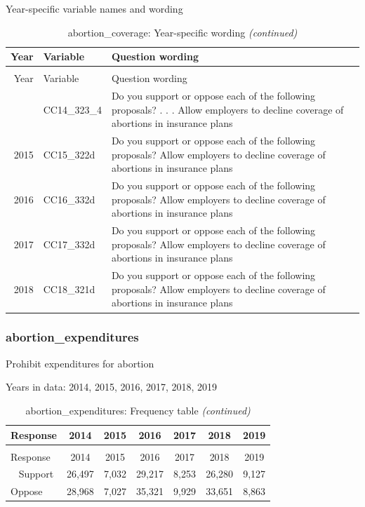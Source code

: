 \documentclass[12pt]{article}
\begin{document}
\endgroup{}

Year-specific variable names and wording

\begin{longtable}[t]{rl>{\raggedright\arraybackslash}p{10cm}}
\caption{\label{tab:unnamed-chunk-4}abortion\_coverage: Year-specific wording}\\
\toprule
Year & Variable & Question wording\\
\midrule
\endfirsthead
\caption[]{abortion\_coverage: Year-specific wording \textit{(continued)}}\\
\toprule
Year & Variable & Question wording\\
\midrule
\endhead
\
\endfoot
\bottomrule
\endlastfoot
2014 & CC14\_323\_4 & Do you support or oppose each of the following proposals? . . . Allow employers to decline coverage of abortions in insurance plans\\
2015 & CC15\_322d & Do you support or oppose each of the following proposals? Allow employers to decline coverage of abortions in insurance plans\\
2016 & CC16\_332d & Do you support or oppose each of the following proposals? Allow employers to decline coverage of abortions in insurance plans\\
2017 & CC17\_332d & Do you support or oppose each of the following proposals? Allow employers to decline coverage of abortions in insurance plans\\
2018 & CC18\_321d & Do you support or oppose each of the following proposals? Allow employers to decline coverage of abortions in insurance plans\\*
\end{longtable}

\subsubsection{abortion\_expenditures}\label{abortion_expenditures}

Prohibit expenditures for abortion

Years in data: 2014, 2015, 2016, 2017, 2018,
2019\begingroup\fontsize{10}{12}\selectfont

\begin{longtable}[t]{lcccccc}
\caption{\label{tab:unnamed-chunk-4}abortion\_expenditures: Frequency table}\\
\toprule
Response & 2014 & 2015 & 2016 & 2017 & 2018 & 2019\\
\midrule
\endfirsthead
\caption[]{abortion\_expenditures: Frequency table \textit{(continued)}}\\
\toprule
Response & 2014 & 2015 & 2016 & 2017 & 2018 & 2019\\
\midrule
\endhead
\
\endfoot
\bottomrule
\endlastfoot
Support & 26,497 & 7,032 & 29,217 & 8,253 & 26,280 & 9,127\\
Oppose & 28,968 & 7,027 & 35,321 & 9,929 & 33,651 & 8,863\\*
\end{longtable}
\end{document}
